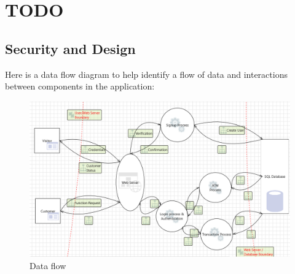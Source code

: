 
\chapter{TODO
}\label{kap:TODO}

\section{Security and Design}

Here is a data flow diagram to help identify a flow of data and interactions between components in the application:

\begin{figure}[H]
   \centering
   \includegraphics[width=\textwidth]{pics/pic4 Data Flow.PNG}
   \caption{Data flow}
   \label{fig:cha2fig1dataflow}
\end{figure}

